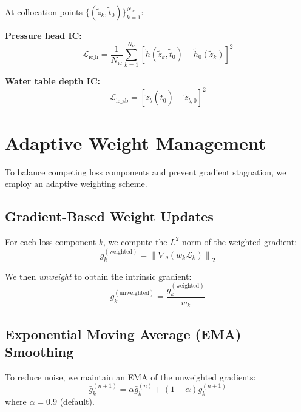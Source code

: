 \documentclass[11pt,a4paper]{article}
\begin{document}
At collocation points $\{(\tilde{z}_k, \tilde{t}_0)\}_{k=1}^{N_{\text{ic}}}$:

\textbf{Pressure head IC:}
\begin{equation}
    \mathcal{L}_{\text{ic\_h}} = \frac{1}{N_{\text{ic}}} \sum_{k=1}^{N_{\text{ic}}} \left[\tilde{h}(\tilde{z}_k, \tilde{t}_0) - \tilde{h}_0(\tilde{z}_k)\right]^2
\end{equation}

\textbf{Water table depth IC:}
\begin{equation}
    \mathcal{L}_{\text{ic\_zb}} = \left[\tilde{z}_b(\tilde{t}_0) - \tilde{z}_{b,0}\right]^2
\end{equation}

\section{Adaptive Weight Management}

To balance competing loss components and prevent gradient stagnation, we employ an adaptive weighting scheme.

\subsection{Gradient-Based Weight Updates}

For each loss component $k$, we compute the $L^2$ norm of the weighted gradient:
\begin{equation}
    g_k^{(\text{weighted})} = \left\|\nabla_\theta (w_k \mathcal{L}_k)\right\|_2
\end{equation}

We then \textit{unweight} to obtain the intrinsic gradient:
\begin{equation}
    g_k^{(\text{unweighted})} = \frac{g_k^{(\text{weighted})}}{w_k}
\end{equation}

\subsection{Exponential Moving Average (EMA) Smoothing}

To reduce noise, we maintain an EMA of the unweighted gradients:
\begin{equation}
    \bar{g}_k^{(n+1)} = \alpha \bar{g}_k^{(n)} + (1 - \alpha) g_k^{(n+1)}
\end{equation}
where $\alpha = 0.9$ (default).
\end{document}
